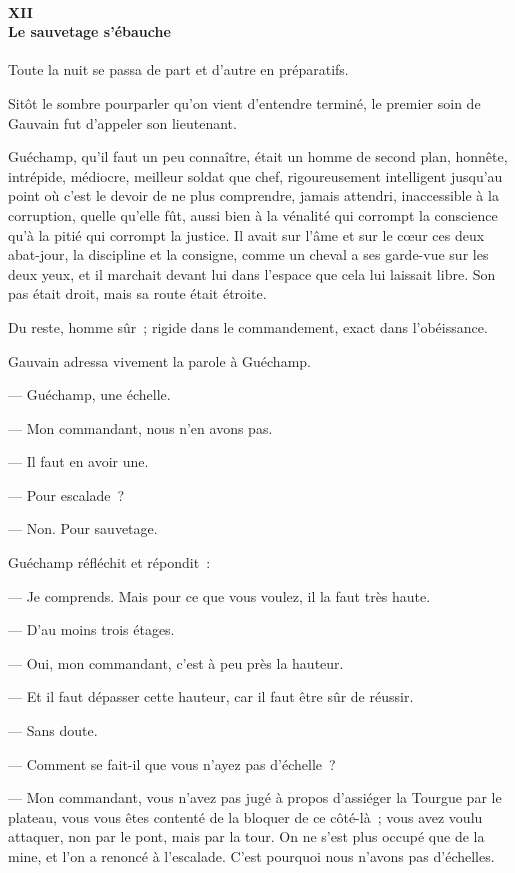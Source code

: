 \documentclass[french,twoside]{book} %
\begin{document}
 \paragraph[{XII. Le sauvetage s’ébauche}]{XII \\
Le sauvetage s’ébauche}
\label{p3l2c12}
\noindent Toute la nuit se passa de part et d’autre en préparatifs.\par
Sitôt le sombre pourparler qu’on vient d’entendre terminé, le premier soin de Gauvain fut d’appeler son lieutenant.\par
Guéchamp, qu’il faut un peu connaître, était un homme de second plan, honnête, intrépide, médiocre, meilleur soldat que chef, rigoureusement intelligent jusqu’au point où c’est le devoir de ne plus comprendre, jamais attendri, inaccessible à la corruption, quelle qu’elle fût, aussi bien à la vénalité qui corrompt la conscience qu’à la pitié qui corrompt la justice. Il avait sur l’âme et sur le cœur ces deux abat-jour, la discipline et la consigne, comme un cheval a ses garde-vue sur les deux yeux, et il marchait devant lui dans l’espace que cela lui laissait libre. Son pas était droit, mais sa route était étroite.\par
Du reste, homme sûr ; rigide dans le commandement, exact dans l’obéissance.\par
Gauvain adressa vivement la parole à Guéchamp.\par
— Guéchamp, une échelle.\par
— Mon commandant, nous n’en avons pas.\par
 — Il faut en avoir une.\par
— Pour escalade ?\par
— Non. Pour sauvetage.\par
Guéchamp réfléchit et répondit :\par
— Je comprends. Mais pour ce que vous voulez, il la faut très haute.\par
— D’au moins trois étages.\par
— Oui, mon commandant, c’est à peu près la hauteur.\par
— Et il faut dépasser cette hauteur, car il faut être sûr de réussir.\par
— Sans doute.\par
— Comment se fait-il que vous n’ayez pas d’échelle ?\par
— Mon commandant, vous n’avez pas jugé à propos d’assiéger la Tourgue par le plateau, vous vous êtes contenté de la bloquer de ce côté-là ; vous avez voulu attaquer, non par le pont, mais par la tour. On ne s’est plus occupé que de la mine, et l’on a renoncé à l’escalade. C’est pourquoi nous n’avons pas d’échelles.\par
\end{document}
